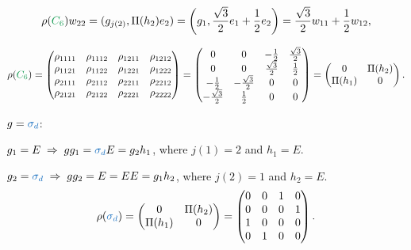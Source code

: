 \begin{example}
\begin{equation} \label{eq:rhoC6_w22_example_inducedrep_D6}
\rho(\Cs) w_{22} = (g_{j(2)}, \Pi(h_2) e_2) = \qty(g_1, \frac{\sqrt{3}}{2}e_1 + \frac{1}{2}e_2)
= \frac{\sqrt{3}}{2} w_{11} + \frac{1}{2}w_{12},
\end{equation}

\begin{equation} \label{eq:rhoC6_matrix_example_inducedrep_D6}
\rho(\Cs) =
\begin{pmatrix}
\rho_{1111} & \rho_{1112} & \rho_{1211} & \rho_{1212} \\
\rho_{1121} & \rho_{1122} & \rho_{1221} & \rho_{1222} \\
\rho_{2111} & \rho_{2112} & \rho_{2211} & \rho_{2212} \\
\rho_{2121} & \rho_{2122} & \rho_{2221} & \rho_{2222} \\
\end{pmatrix}
=
\begin{pmatrix}
0                   & 0                   & -\frac{1}{2}       & \frac{\sqrt{3}}{2} \\
0                   & 0                   & \frac{\sqrt{3}}{2} & \frac{1}{2}        \\
-\frac{1}{2}        & -\frac{\sqrt{3}}{2} & 0                  & 0                  \\
-\frac{\sqrt{3}}{2} & \frac{1}{2}         & 0                  & 0                  \\
\end{pmatrix}
=
\begin{pmatrix}
0 & \Pi(h_2) \\
\Pi(h_1) & 0
\end{pmatrix}.
\end{equation}

\n

$g = \sd$:

$g_1 = E \implies g g_1 = \sd E = g_2 h_1$, where $j(1) = 2$ and $h_1 = E$.

$g_2 = \sd \implies g g_2 = E = E E = g_1 h_2$, where $j(2) = 1$ and $h_2 = E$.
\begin{equation} \label{eq:rhosd_matrix_example_inducedrep_D6}
\rho(\sd) =
\begin{pmatrix}
0 & \Pi(h_2) \\
\Pi(h_1) & 0
\end{pmatrix}
=
\begin{pmatrix}
0 & 0 & 1 & 0 \\
0 & 0 & 0 & 1 \\
1 & 0 & 0 & 0 \\
0 & 1 & 0 & 0 \\
\end{pmatrix}.
\end{equation}


\end{example}
